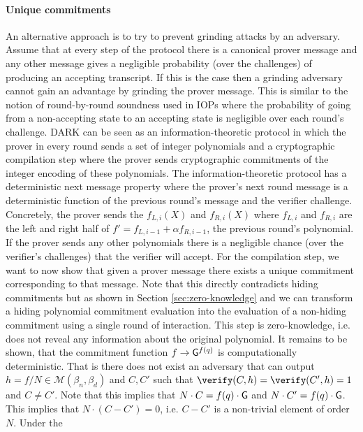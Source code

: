  \paragraph{Unique commitments}
 An alternative approach is to try to prevent grinding attacks by an adversary. Assume that at every step of the protocol there is a canonical prover message and any other message gives a negligible probability (over the challenges) of producing an accepting transcript. If this is the case then a grinding adversary cannot gain an advantage by grinding the prover message. This is similar to the notion of round-by-round soundness used in IOPs \cite{IOPs} where the probability of going from a non-accepting state to an accepting state is negligible over each round's challenge. 
DARK can be seen as an information-theoretic protocol in which the prover in every round sends a set of integer polynomials and a cryptographic compilation step where the prover sends cryptographic commitments of the integer encoding of these polynomials. The information-theoretic protocol has a deterministic next message property where the prover's next round message is a deterministic function of the previous round's message and the verifier challenge. Concretely, the prover sends the $f_{L,i}(X)$ and $f_{R,i}(X)$ where $f_{L,i}$ and $f_{R,i}$ are the left and right half of $f'=f_{L,i-1}+\alpha f_{R,i-1}$, the previous round's polynomial. If the prover sends any other polynomials there is a negligible chance (over the verifier's challenges) that the verifier will accept. 
For the compilation step, we want to now show that given a prover message there exists a unique commitment corresponding to that message. Note that this directly contradicts hiding commitments but as shown in Section \cref{sec:zero-knowledge} and \cite{HaloInfinite} we can transform a hiding polynomial commitment evaluation into the evaluation of a non-hiding commitment using a single round of interaction. This step is zero-knowledge, i.e. does not reveal any information about the original polynomial. 
It remains to be shown, that the commitment function $f\rightarrow \Generator^{f(q)}$ is computationally deterministic. That is there does not exist an adversary that can output $h=f/N\in \mathcal{M}(\beta_n,\beta_d)$ and $C,C'$ such that $\verify(C,h)=\verify(C',h)=1$ and $C\neq C'$. 
Note that this implies that $N\cdot C=f(q)\cdot \Generator$ and $N\cdot C'=f(q)\cdot \Generator$. This implies that $N\cdot (C-C')=0$, i.e. $C-C'$ is a non-trivial element of order $N$. Under the 


